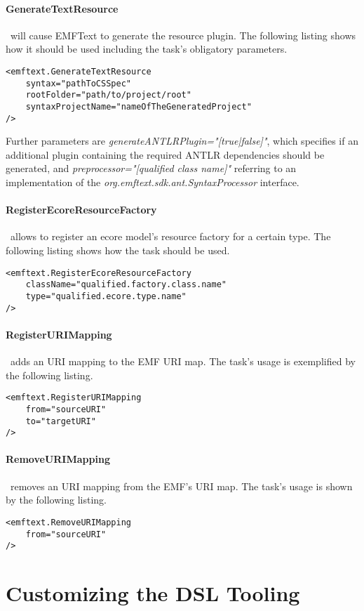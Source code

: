 \paragraph*{GenerateTextResource}~will cause EMFText to generate the resource plugin. 
The following listing shows how it should be used including the task's obligatory parameters.
\begin{lstlisting}
<emftext.GenerateTextResource
	syntax="pathToCSSpec"
	rootFolder="path/to/project/root"
	syntaxProjectName="nameOfTheGeneratedProject"
/>
\end{lstlisting}
Further parameters are \emph{generateANTLRPlugin="[true|false]"}, which specifies if an additional plugin
containing the required ANTLR dependencies should be generated, and \emph{preprocessor="[qualified class name]"}
referring to an implementation of the \emph{org.emftext.sdk.ant.Syntax\-Processor} interface. 
\paragraph*{RegisterEcoreResourceFactory}~allows to register an ecore model's resource factory for a 
certain type. The following listing shows how the task should be used.
\begin{lstlisting}
<emftext.RegisterEcoreResourceFactory
	className="qualified.factory.class.name"
	type="qualified.ecore.type.name"
/>
\end{lstlisting}
\paragraph*{RegisterURIMapping}~adds an URI mapping to the EMF URI map. The task's usage is exemplified by the 
following listing.
\begin{lstlisting}
<emftext.RegisterURIMapping
	from="sourceURI"
	to="targetURI"
/>
\end{lstlisting}
\paragraph*{RemoveURIMapping}~removes an URI mapping from the EMF's URI map. The task's usage is shown by the
following listing. 
\begin{lstlisting}
<emftext.RemoveURIMapping
	from="sourceURI"
/>
\end{lstlisting}
\section{Customizing the DSL Tooling}

